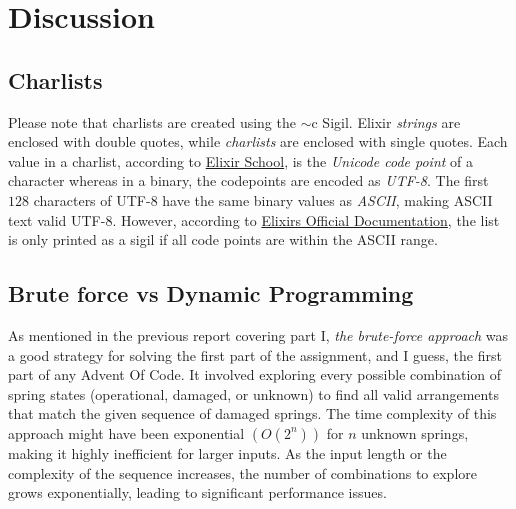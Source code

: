 \documentclass[a4paper,11pt]{article}
\begin{document}


\section*{Discussion}\label{sec:discussion}
\subsection*{Charlists}
Please note that charlists are created using the
$\sim$c Sigil.
Elixir \emph{strings} are enclosed with double quotes,
while \emph{charlists} are enclosed with single quotes.
Each value in a charlist, according to
\href{https://elixirschool.com/en/lessons/basics/strings#charlists-1}{Elixir School},
is the \emph{Unicode code point} of a character whereas in a binary,
the codepoints are encoded as \emph{UTF-8}.
The first $128$ characters of UTF-8 have the same binary values as \emph{ASCII},
making ASCII text valid UTF-8.
However, according to
\href{https://hexdocs.pm/elixir/binaries-strings-and-charlists.html}{Elixirs Official Documentation},
the list is only printed as a sigil if all code points are within the ASCII range.
\subsection*{Brute force vs Dynamic Programming}
As mentioned in the previous report covering part I,
\emph{the brute-force approach} was a good strategy for solving the first part of the assignment,
and I guess, the first part of any Advent Of Code.
It involved exploring every possible combination of
spring states (operational, damaged, or unknown) to find all valid
arrangements that match the given sequence of damaged springs.
The time complexity of this approach might have been exponential $(O(2^n))$
for $n$ unknown
springs, making it highly inefficient for larger inputs.
As the input
length or the complexity of the sequence increases, the number of
combinations to explore grows exponentially, leading to significant
performance issues.
\end{document}
